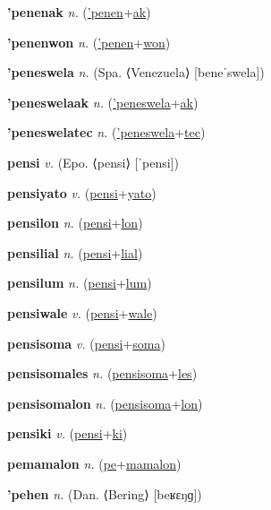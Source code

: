 \textbf{\hypertarget{'penenak}{'penenak}} \textit{n.} (\hyperlink{'penen}{'penen}+\allowbreak \hyperlink{ak}{ak})


\textbf{\hypertarget{'penenwon}{'penenwon}} \textit{n.} (\hyperlink{'penen}{'penen}+\allowbreak \hyperlink{won}{won})


\textbf{\hypertarget{'peneswela}{'peneswela}} \textit{n.} (Spa. ⟨Venezuela⟩ [beneˈswela])


\textbf{\hypertarget{'peneswelaak}{'peneswelaak}} \textit{n.} (\hyperlink{'peneswela}{'peneswela}+\allowbreak \hyperlink{ak}{ak})


\textbf{\hypertarget{'peneswelatec}{'peneswelatec}} \textit{n.} (\hyperlink{'peneswela}{'peneswela}+\allowbreak \hyperlink{tec}{tec})


\textbf{\hypertarget{pensi}{pensi}} \textit{v.} (Epo. ⟨pensi⟩ [ˈpensi])


\textbf{\hypertarget{pensiyato}{pensiyato}} \textit{v.} (\hyperlink{pensi}{pensi}+\allowbreak \hyperlink{yato}{yato})


\textbf{\hypertarget{pensilon}{pensilon}} \textit{n.} (\hyperlink{pensi}{pensi}+\allowbreak \hyperlink{lon}{lon})


\textbf{\hypertarget{pensilial}{pensilial}} \textit{n.} (\hyperlink{pensi}{pensi}+\allowbreak \hyperlink{lial}{lial})


\textbf{\hypertarget{pensilum}{pensilum}} \textit{n.} (\hyperlink{pensi}{pensi}+\allowbreak \hyperlink{lum}{lum})


\textbf{\hypertarget{pensiwale}{pensiwale}} \textit{v.} (\hyperlink{pensi}{pensi}+\allowbreak \hyperlink{wale}{wale})


\textbf{\hypertarget{pensisoma}{pensisoma}} \textit{v.} (\hyperlink{pensi}{pensi}+\allowbreak \hyperlink{soma}{soma})


\textbf{\hypertarget{pensisomales}{pensisomales}} \textit{n.} (\hyperlink{pensisoma}{pensisoma}+\allowbreak \hyperlink{les}{les})


\textbf{\hypertarget{pensisomalon}{pensisomalon}} \textit{n.} (\hyperlink{pensisoma}{pensisoma}+\allowbreak \hyperlink{lon}{lon})


\textbf{\hypertarget{pensiki}{pensiki}} \textit{v.} (\hyperlink{pensi}{pensi}+\allowbreak \hyperlink{ki}{ki})


\textbf{\hypertarget{pemamalon}{pemamalon}} \textit{n.} (\hyperlink{pe}{pe}+\allowbreak \hyperlink{mamalon}{mamalon})


\textbf{\hypertarget{'pehen}{'pehen}} \textit{n.} (Dan. ⟨Bering⟩ [beʁɛŋɡ])


